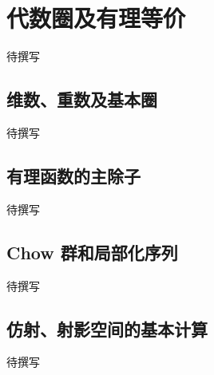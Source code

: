 
% 
% 

\section{代数圈及有理等价}
\label{g5:sec:2701}

待撰写

\subsection{维数、重数及基本圈}
\label{g5:subsec:2701:01}
待撰写

\subsection{有理函数的主除子}
\label{g5:subsec:2701:02}
待撰写

\subsection{Chow 群和局部化序列}
\label{g5:subsec:2701:03}
待撰写

\subsection{仿射、射影空间的基本计算}
\label{g5:subsec:2701:04}
待撰写
